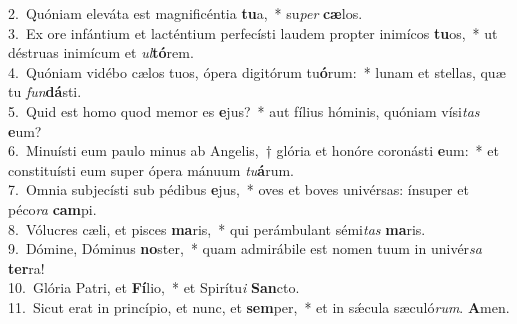 {2.~}Quóniam eleváta est magnificéntia \textbf{tu}a,~* su\textit{per} \textbf{cæ}los.\\
{3.~}Ex ore infántium et lacténtium perfecísti laudem propter inimícos \textbf{tu}os,~* ut déstruas inimícum et \textit{ul}\textbf{tó}rem.\\
{4.~}Quóniam vidébo cælos tuos, ópera digitórum tu\textbf{ó}rum:~* lunam et stellas, quæ tu \textit{fun}\textbf{dá}sti.\\
{5.~}Quid est homo quod memor es \textbf{e}jus?~* aut fílius hóminis, quóniam vísi\textit{tas} \textbf{e}um?\\
{6.~}Minuísti eum paulo minus ab Angelis,~† glória et honóre coronásti \textbf{e}um:~* et constituísti eum super ópera mánuum \textit{tu}\textbf{á}rum.\\
{7.~}Omnia subjecísti sub pédibus \textbf{e}jus,~* oves et boves univérsas: ínsuper et péco\textit{ra} \textbf{cam}pi.\\
{8.~}Vólucres cæli, et pisces \textbf{ma}ris,~* qui perámbulant sémi\textit{tas} \textbf{ma}ris.\\
{9.~}Dómine, Dóminus \textbf{no}ster,~* quam admirábile est nomen tuum in univér\textit{sa} \textbf{ter}ra!\\
{10.~}Glória Patri, et \textbf{Fí}lio,~* et Spirítu\textit{i} \textbf{San}cto.\\
{11.~}Sicut erat in princípio, et nunc, et \textbf{sem}per,~* et in sǽcula sæculó\textit{rum}. \textbf{A}men.\\
